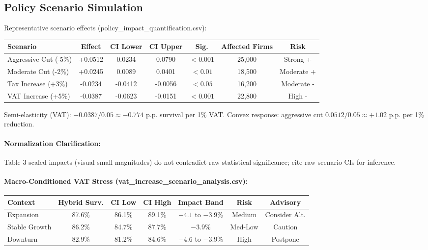 \subsection{Policy Scenario Simulation}\label{sec:policy_scenarios}
Representative scenario effects (policy\_impact\_quantification.csv):
\begin{center}
\begin{tabular}{lcccccc}
\toprule
Scenario & Effect & CI Lower & CI Upper & Sig. & Affected Firms & Risk \\
\midrule
Aggressive Cut (-5\%) & +0.0512 & 0.0234 & 0.0790 & $<0.001$ & 25{,}000 & Strong + \\
Moderate Cut (-2\%) & +0.0245 & 0.0089 & 0.0401 & $<0.01$ & 18{,}500 & Moderate + \\
Tax Increase (+3\%) & -0.0234 & -0.0412 & -0.0056 & $<0.05$ & 16{,}200 & Moderate - \\
VAT Increase (+5\%) & -0.0387 & -0.0623 & -0.0151 & $<0.001$ & 22{,}800 & High - \\
\bottomrule
\end{tabular}
\end{center}
Semi-elasticity (VAT): $-0.0387 / 0.05 \approx -0.774$ p.p. survival per 1\% VAT. Convex response: aggressive cut $0.0512/0.05 \approx +1.02$ p.p. per 1\% reduction.

\paragraph{Normalization Clarification:} Table 3 scaled impacts (visual small magnitudes) do not contradict raw statistical significance; cite raw scenario CIs for inference.

\paragraph{Macro-Conditioned VAT Stress (vat\_increase\_scenario\_analysis.csv):}
\begin{center}
\begin{tabular}{lcccccc}
\toprule
Context & Hybrid Surv. & CI Low & CI High & Impact Band & Risk & Advisory \\
\midrule
Expansion & 87.6\% & 86.1\% & 89.1\% & $-4.1$ to $-3.9$\% & Medium & Consider Alt. \\
Stable Growth & 86.2\% & 84.7\% & 87.7\% & $-3.9$\% & Med-Low & Caution \\
Downturn & 82.9\% & 81.2\% & 84.6\% & $-4.6$ to $-3.9$\% & High & Postpone \\
\bottomrule
\end{tabular}
\end{center}

